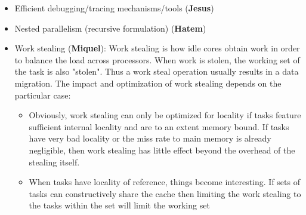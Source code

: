 \begin{itemize}
\begin{itemize}
					task\_groups, OpenMP 3.0 Tasks). In this scenario scheduling involves fetching a task from the ready queue(s)
					or running the work-stealing loop if there are no ready tasks in the queues. This scheme has low overhead but
					supports mainly divide-and-conquer and parallel loop style of computation.
				\item  {\emph Task-dataflow}: In dataflow schemes (cite: OmpSs, OpenMP 4.0 tasks, TBB dependencies) there are two
					scheduling levels: 1) resolving dependencies to find ready tasks and 2) scheduling ready tasks to
					workers. The latter is in general performed as in task-parallel schemes. 
			\end{itemize} 
				Because of these differences, task-parallel runtimes tend to have smaller scheduling overheads compared to
				task-dataflow runtimes. It is an open research problem to reduce the overheads of task-dataflow schedulers in order to
				efficiently support tasks of finer granularity. Some researchers propose to replace the dependency-tracking scheduler
				with a ticket-based approach (cite: SWAN). Other groups propose to implement the parts of the scheduler in hardware,
				such as the dependency tracking mechanism (cite: HTSS, Nexus++) or the ready queues and task scheduler (cite:
				Carbon).
		\item Efficient debugging/tracing mechanisms/tools (\textbf{Jesus})
		\item Nested parallelism (recursive formulation) (\textbf{Hatem})
		\item Work stealing (\textbf{Miquel}):
			Work stealing is how idle cores obtain work in order to balance the load across processors. When work is stolen, the working
			set of the task is also "stolen". Thus a work steal operation usually results in a data migration.  The impact and
			optimization of work stealing depends on the particular case:
				\begin{itemize}
					\item Obviously, work stealing can only be optimized for locality if tasks feature sufficient
						internal locality and are to an extent memory bound. If tasks have very bad locality or the miss rate
						to main memory is already negligible, then work stealing has little effect beyond the overhead of the
						stealing itself. 
					\item When tasks have locality of reference, things become interesting. If sets of tasks can constructively
						share the cache then limiting the work stealing to the tasks within the set will limit the working set

\end{itemize}
\end{itemize}
